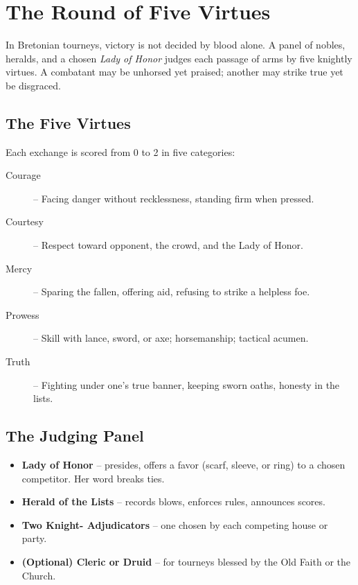 \documentclass[11pt,twoside]{book}
\begin{document}

\section*{The Round of Five Virtues}

In Bretonian tourneys, victory is not decided by blood alone. A panel of nobles, heralds, and a chosen \textit{Lady of Honor} judges each passage of arms by five knightly virtues. A combatant may be unhorsed yet praised; another may strike true yet be disgraced.

\subsection*{The Five Virtues}
Each exchange is scored from 0 to 2 in five categories:

\begin{description}
    \item[Courage] -- Facing danger without recklessness, standing firm when pressed.
    \item[Courtesy] -- Respect toward opponent, the crowd, and the Lady of Honor.
    \item[Mercy] -- Sparing the fallen, offering aid, refusing to strike a helpless foe.
    \item[Prowess] -- Skill with lance, sword, or axe; horsemanship; tactical acumen.
    \item[Truth] -- Fighting under one's true banner, keeping sworn oaths, honesty in the lists.
\end{description}

\subsection*{The Judging Panel}
\begin{itemize}
    \item \textbf{Lady of Honor} -- presides, offers a favor (scarf, sleeve, or ring) to a chosen competitor. Her word breaks ties.
    \item \textbf{Herald of the Lists} -- records blows, enforces rules, announces scores.
    \item \textbf{Two Knight- Adjudicators} -- one chosen by each competing house or party.
    \item \textbf{(Optional) Cleric or Druid} -- for tourneys blessed by the Old Faith or the Church.
\end{itemize}
\end{document}
